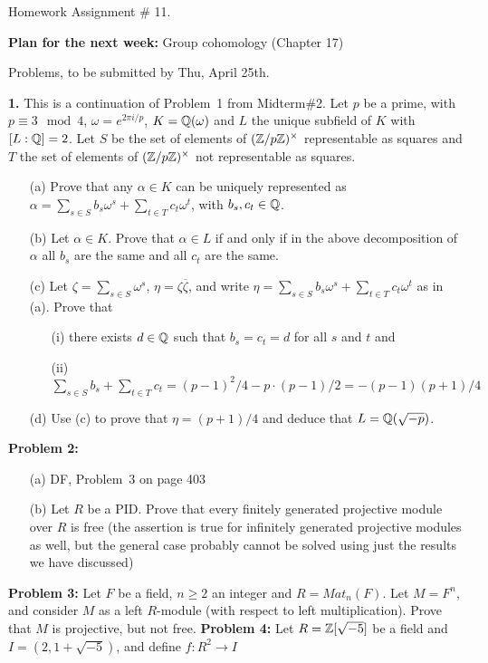 \documentclass[12pt]{article}
\begin{document}
\bf\centerline{Homework Assignment \# 11. }\rm
\skv
\skv
{\bf Plan for the next week:} Group cohomology (Chapter 17)
\skv
\skv
\bf\centerline{Problems, to be submitted by Thu, April 25th. }\rm
\skv
\skv
\skv
{\bf 1.} This is a continuation of Problem~1 from Midterm\#2.
Let $p$ be a prime, with $p\equiv 3\mod 4$, $\omega=e^{2\pi i/p}$, $K={\mathbb Q}(\omega)$ and $L$ the unique subfield of $K$ with $[L:{\mathbb Q}]=2$. 
Let $S$ be the set of elements of $({\mathbb Z}/p{\mathbb Z})^{\times}$ 
representable as squares and $T$ the set of elements of 
$({\mathbb Z}/p{\mathbb Z})^{\times}$ not representable as squares.
\begin{itemize}
\item[(a)] Prove that any $\alpha\in K$ can be uniquely represented
as $\alpha=\sum_{s\in S}b_s \omega^s+\sum_{t\in T}c_t \omega^t$,
with $b_s,c_t\in{\mathbb Q}$.
\item[(b)] Let $\alpha\in K$. Prove that $\alpha\in L$ if and only
if in the above decomposition of $\alpha$ all $b_s$ are the same
and all $c_t$ are the same.
\item[(c)] Let $\zeta=\sum_{s\in S}\omega^s$, $\eta=\zeta\overline\zeta$,
and write $\eta=\sum_{s\in S}b_s \omega^s+\sum_{t\in T}c_t \omega^t$ as in (a).
Prove that 
\begin{itemize}
\item[(i)] there exists $d\in {\mathbb Q}$ such that $b_s=c_t=d$
for all $s$ and $t$ and
\item[(ii)] $\sum_{s\in S}b_s+\sum_{t\in T}c_t=(p-1)^2/4-p\cdot (p-1)/2=-(p-1)(p+1)/4$
\end{itemize}
\item[(d)] Use (c) to prove that $\eta=(p+1)/4$ and deduce that 
$L={\mathbb Q}(\sqrt{-p})$.
\end{itemize}
\skv
{\bf Problem 2:} 
\begin{itemize}
\item[(a)] DF, Problem~3 on page 403
\item[(b)] Let $R$ be a PID. Prove that every finitely generated projective module over $R$ is free (the assertion is true for infinitely generated projective modules as well, but the general case probably cannot be solved using just the results we have discussed)
\end{itemize}
\skv
{\bf Problem 3:} Let $F$ be a field, $n\geq 2$ an integer and $R=Mat_n(F)$. Let $M=F^n$, and consider $M$ as a left $R$-module (with respect to left multiplication). Prove that $M$ is projective, but not free. 
\skv 
{\bf Problem 4:} Let $R={\mathbb Z}[\sqrt{-5}]$ be a field and $I=(2,1+\sqrt{-5})$, and define $f:R^2\to I$
\end{document}
